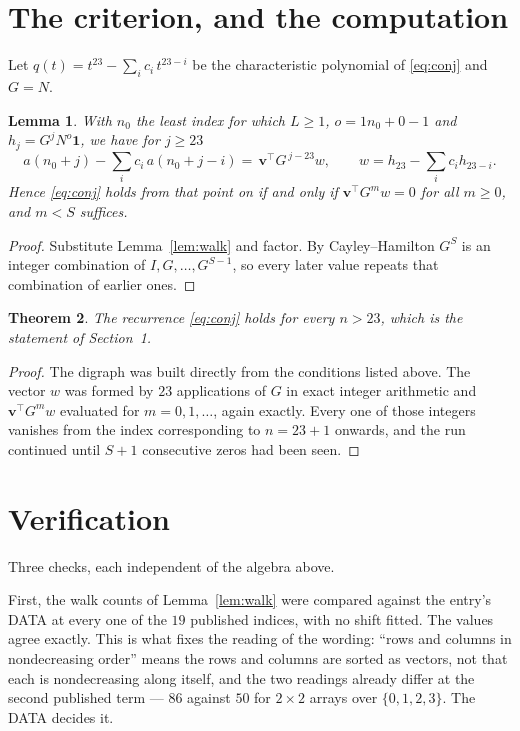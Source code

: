 \documentclass[11pt,a4paper]{article}
\theoremstyle{plain}
\newtheorem{theorem}{Theorem}
\newtheorem{lemma}[theorem]{Lemma}
\theoremstyle{definition}
\begin{document}
\section{The criterion, and the computation}

Let $q(t)=t^{23}-\sum_i c_i\,t^{23-i}$ be the characteristic polynomial of
\eqref{eq:conj} and $G=N$.

\begin{lemma}\label{lem:crit}
With $n_0$ the least index for which $L\ge1$, $o=1n_0+0-1$ and
$h_j=G^{j}N^{o}\mathbf{1}$, we have for $j\ge23$
\[
a(n_0+j)-\sum_i c_i\,a(n_0+j-i)=\,\mathbf{v}^{\!\top}G^{\,j-23}w,
\qquad w=h_{23}-\sum_i c_ih_{23-i} .
\]
Hence \eqref{eq:conj} holds from that point on if and only if
$\mathbf{v}^{\!\top}G^{m}w=0$ for all $m\ge0$, and $m<S$ suffices.
\end{lemma}

\begin{proof}
Substitute Lemma~\ref{lem:walk} and factor. By Cayley--Hamilton $G^{S}$ is an integer
combination of $I,G,\dots,G^{S-1}$, so every later value repeats that combination of
earlier ones.
\end{proof}

\begin{theorem}
The recurrence \eqref{eq:conj} holds for every $n>23$, which is the statement of
Section~1.
\end{theorem}

\begin{proof}
The digraph was built directly from the conditions listed above. The vector $w$ was formed by
$23$ applications of $G$ in exact integer arithmetic and $\mathbf{v}^{\!\top}G^{m}w$
evaluated for $m=0,1,\dots$, again exactly. Every one of those integers vanishes from the
index corresponding to $n=23+1$ onwards, and the run continued until $S+1$ consecutive
zeros had been seen.
\end{proof}

\section{Verification}

Three checks, each independent of the algebra above.

First, the walk counts of Lemma~\ref{lem:walk} were compared against the entry's DATA at
every one of the $19$ published indices, with no shift fitted. The values agree exactly.
This is what fixes the reading of the wording: ``rows and columns in nondecreasing order''
means the rows and columns are sorted as vectors, not that each is nondecreasing along
itself, and the two readings already differ at the second published term --- $86$ against
$50$ for $2\times2$ arrays over $\{0,1,2,3\}$. The DATA decides it.
\end{document}
